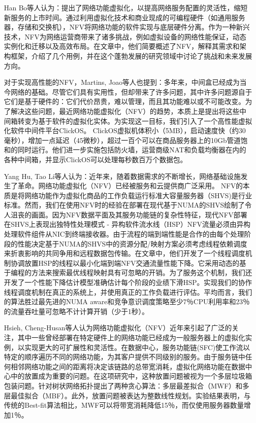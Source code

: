 Han Bo等人认为：提出了网络功能虚拟化，以提高网络服务配置的灵活性，缩短新服务的上市时间。通过利用虚拟化技术和商业现成的可编程硬件（如通用服务器，存储和交换机），NFV将网络功能的软件实现与底层硬件分离。作为一种新兴技术，NFV为网络运营商带来了诸多挑战，例如虚拟设备的网络性能保证，动态实例化和迁移以及高效布局。在文章中，他们简要概述了NFV，解释其需求和架构框架，介绍了几个用例，并在这个蓬勃发展的研究领域中讨论了挑战和未来发展方向。

对于实现高性能的NFV，Martins, Joao等人也提到：多年来，中间盒已经成为当今网络的基础。尽管它们具有实用性，但却带来了许多问题，其中许多问题源自于它们是基于硬件的：它们代价昂贵，难以管理，而且其功能难以或不可能改变。为了解决这些问题，最近网络功能虚拟化（NFV）的趋势，本质上是提出将这些中间箱转变为基于软件的虚拟化实体。为实现这一目标，我们引入了一个高性能虚拟化软件中间件平台ClickOS。 ClickOS虚拟机体积小（5MB），启动速度快（约30毫秒），增加一点延迟（45微秒），超过一百个可以在商品服务器上的10Gb管道饱和的同时运行。他们进一步实施包括防火墙，运营商级NAT和负载均衡器在内的各种中间箱，并显示ClickOS可以处理每秒数百万个数据包。

Yang Hu, Tao Li等人认为：近年来，随着数据需求的不断增长，网络基础设施发生了革命。网络功能虚拟化（NFV）已经被服务和云提供商广泛采用。 NFV的本质是将网络功能作为虚拟化商品的工作负载运行标准大容量服务器（SHVS)是行业标准。然而，我们在使用NFV时的经验在部署在现代基于NUMA的SHVS绘制了令人沮丧的画面。因为NFV数据平面及其服务功能链的复杂性特征，现代NFV部署在SHVS上表现出独特性处理模式 - 异构软件流水线（HSP）NFV流量必须由异构处理软件组件从NIC到终端接收器。由于流程的端到端性能是合作的由每个处理阶段的性能决定基于NUMA的SHVS中的资源分配/映射方案必须考虑线程依赖调度来折衷影响的共同争用和远程数据包传输。在文章中，他们开发了一个线程调度机制协调放置HSP的线程以最小化端到端NFV交通流量性能下降。它采用动态的基于编程的方法来搜索最优线程映射具有可忽略的开销。为了服务这个机制，我们还开发了一个性能下降估计模型准确估计每个阶段的业绩下滑HSP。实现我们的协作线程调度机制在真正的系统上，并使用真正的工作负载进行评估。平均而言，我们的算法胜过最先进的NUMA aware和竞争意识调度策略至少7％CPU利用率和23％的流量吞吐量可忽略不计计算开销（少于1秒）。

Hsieh, Cheng-Husan等人认为网络功能虚拟化（NFV）近年来引起了广泛的关注，其中一些曾经部署在特定硬件上的网络功能已经成为一般服务器上的虚拟化实例，以实现更大的可扩展性和灵活性。在数据中心，服务功能链(SFC)使工作流以特定的顺序遍历不同的网络功能，为其客户提供不同级别的服务。由于服务链中任何相邻网络功能之间的距离将决定该链路的总带宽消耗，虚拟化网络功能在数据中心中的放置成为重要的问题。在这项研究中，这种放置问题被视为一个多层垃圾箱包装问题。针对树状网络拓扑提出了两种贪心算法：多层最差拟合（MWF）和多层最佳拟合（MBF）。此外，放置问题被表达为整数线性规划。实验结果表明，与传统的Best-fit算法相比，MWF可以将带宽消耗降低15％，而仅使用服务器数量增加1％。


